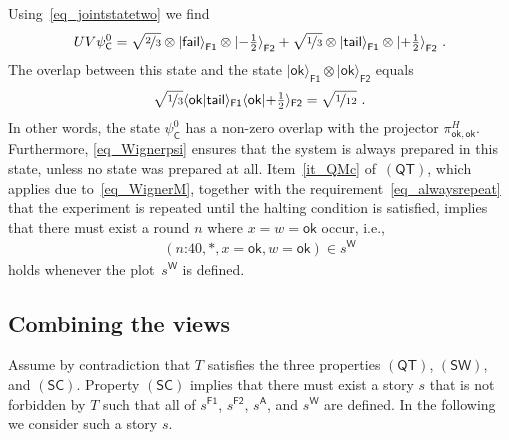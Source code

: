 \documentclass[12pt]{article}
\theoremstyle{plain}
\theoremstyle{definition}
\newcommand*{\ket}[1]{{| #1 \rangle}}
\newcommand*{\spr}[2]{\langle #1 | #2 \rangle}
\newcommand*{\Friendone}{\mathsf{F1}}
\newcommand*{\Friendtwo}{\mathsf{F2}}
\newcommand*{\Assistant}{\mathsf{A}}
\newcommand*{\Wigner}{\mathsf{W}}
\newcommand*{\Coin}{\mathsf{C}}
\newcommand*{\sminus}{{\textstyle - \frac{1}{2}}}
\newcommand*{\splus}{{\textstyle + \frac{1}{2}}}
\newcommand*{\QT}{\mathsf{(QT)}}
\newcommand*{\SW}{\mathsf{(SW)}}
\newcommand*{\SelfCons}{\mathsf{(SC)}}
\newcommand*{\ok}{\mathsf{ok}}
\newcommand*{\fail}{\mathsf{fail}}
\newcommand*{\tail}{\mathsf{tail}}
\begin{document}
Using~\eqref{eq_jointstatetwo} we find
\begin{align} \label{eq_global}
    U V \psi^0_\Coin 
  = \sqrt{\nicefrac{2}{3}} \otimes \ket{\fail}_{\Friendone} \otimes \ket{\sminus}_{\Friendtwo} 
    + \sqrt{\nicefrac{1}{3}} \otimes \ket{\tail}_{\Friendone} \otimes \ket{\splus}_{\Friendtwo} \ .
\end{align}
The overlap between this state and the state $\ket{\ok}_{\Friendone}  \otimes  \ket{\ok}_{\Friendtwo}$ equals
\begin{align*}
  \sqrt{\nicefrac{1}{3}} \spr{\ok}{\tail}_{\Friendone} \spr{\ok}{\splus}_{\Friendtwo} = \sqrt{\nicefrac{1}{12}}  \ .
\end{align*}
In other words, the state $\psi^0_{\Coin}$ has a non-zero overlap with the projector $\pi^H_{\ok, \ok}$.  Furthermore, \eqref{eq_Wignerpsi} ensures that the system is always prepared in this state, unless no state was prepared at all. Item~\ref{it_QMc} of~$\QT$, which applies due to~\eqref{eq_WignerM}, together with the requirement~\eqref{eq_alwaysrepeat} that the experiment is repeated until the halting condition is satisfied, implies that there must exist a round $n$ where  $x = w = \ok$ occur, i.e., 
\begin{align} \label{eq_QTWigner}
   (\text{$n$:40}, *, x=\ok,  w=\ok) \in s^{\Wigner} 
\end{align}
holds whenever the plot~$s^{\Wigner}$ is defined.


\subsection{Combining the views}

Assume by contradiction that $T$ satisfies the three properties $\QT$, $\SW$, and $\SelfCons$. Property $\SelfCons$ implies that there must exist a story $s$ that is not forbidden by $T$ such that all of $s^{\Friendone}$, $s^{\Friendtwo}$, $s^{\Assistant}$, and $s^{\Wigner}$ are defined. In the following we consider such a story $s$. 
\end{document}
